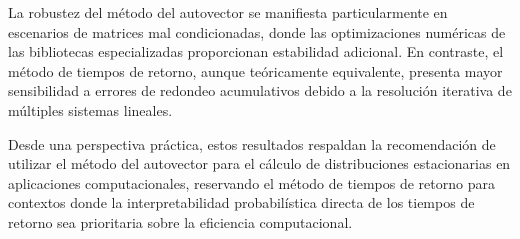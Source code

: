 La robustez del método del autovector se manifiesta particularmente en escenarios de matrices mal condicionadas, donde las optimizaciones numéricas de las bibliotecas especializadas proporcionan estabilidad adicional. En contraste, el método de tiempos de retorno, aunque teóricamente equivalente, presenta mayor sensibilidad a errores de redondeo acumulativos debido a la resolución iterativa de múltiples sistemas lineales.

Desde una perspectiva práctica, estos resultados respaldan la recomendación de utilizar el método del autovector para el cálculo de distribuciones estacionarias en aplicaciones computacionales, reservando el método de tiempos de retorno para contextos donde la interpretabilidad probabilística directa de los tiempos de retorno sea prioritaria sobre la eficiencia computacional.